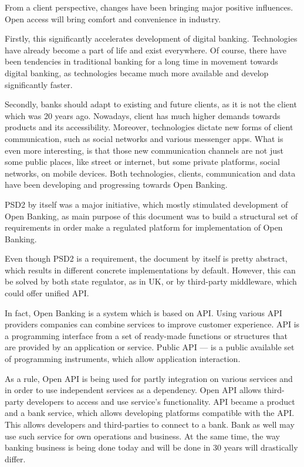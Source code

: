 From a client perspective, changes have been bringing major positive influences.
Open access will bring comfort and convenience in industry.

Firstly, this significantly accelerates development of digital banking.
Technologies have already become a part of life and exist everywhere.
Of course, there have been tendencies in traditional banking for a long time in movement towards digital banking, as technologies became much more available and develop significantly faster.

Secondly, banks should adapt to existing and future clients, as it is not the client which was 20 years ago.
Nowadays, client has much higher demands towards products and its accessibility.
Moreover, technologies dictate new forms of client communication, such as social networks and various messenger apps.
What is even more interesting, is that those new communication channels are not just some public places, like street or internet, but some private platforms, social networks, on mobile devices.
Both technologies, clients, communication and data have been developing and progressing towards Open Banking.

PSD2 by itself was a major initiative, which mostly stimulated development of Open Banking, as main purpose of this document was to build a structural set of requirements in order make a regulated platform for implementation of Open Banking.

Even though PSD2 is a requirement, the document by itself is pretty abstract, which results in different concrete implementations by default.
However, this can be solved by both state regulator, as in UK, or by third-party middleware, which could offer unified API.

In fact, Open Banking is a system which is based on API.
Using various API providers companies can combine services to improve customer experience.
API is a programming interface from a set of ready-made functions or structures that are provided by an application or service.
Public API — is a public available set of programming instruments, which allow application interaction.

As a rule, Open API is being used for partly integration on various services and in order to use independent services as a dependency.
Open API allows third-party developers to access and use service's functionality.
API became a product and a bank service, which allows developing platforms compatible with the API.
This allows developers and third-parties to connect to a bank. 
Bank as well may use such service for own operations and business.
At the same time, the way banking business is being done today and will be done in 30 years will drastically differ.

